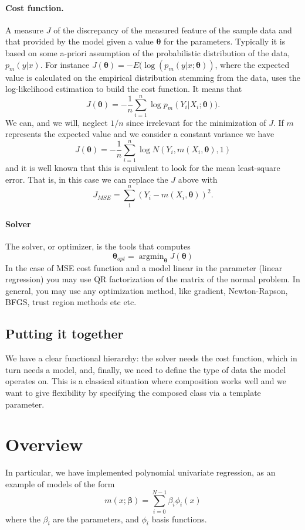 \documentclass{article}
\begin{document}
\paragraph{\textbf{Cost function.}} A measure $J$ of the discrepancy of
  the measured feature of the sample data and that provided by the model
  given a value $\boldsymbol{\theta}$ for the parameters. Typically it is based on some a-priori
  assumption of the probabilistic distribution of the data, $p_m(y|x)$. For instance $J(\boldsymbol{\theta})=-E(\log(p_m(y|x;\boldsymbol{\theta}))$,
  where the expected value is calculated on the empirical distribution stemming
  from the data,
  uses the log-likelihood estimation to build the cost function. It means that
  \[
   J(\boldsymbol{\theta})=-\frac{1}{n}\sum_{i=1}^n \log p_m(Y_i|X_i;\boldsymbol{\theta})).
 \]
 We can, and we will, neglect $1/n$ since irrelevant for the minimization of $J$.
 If $m$ represents the expected value and we consider a constant variance we have
   \[
   J(\boldsymbol{\theta})=-\frac{1}{n}\sum_{i=1}^n \log N(Y_i,m(X_i,\boldsymbol{\theta}),1)
 \]
 and it is well known that this is equivalent to look for the mean least-square
 error. That is, in this case we can replace the $J$ above with
 \[
   J_{MSE}=\sum_1^n(Y_i-  m(X_i,\boldsymbol{\theta}))^2.
 \]
 \paragraph{\textbf{Solver}} The solver, or optimizer, is the tools that computes
 \[
   \boldsymbol{\theta}_{opt}=\operatorname{argmin}_{\boldsymbol{\theta}}J(\boldsymbol{\theta})
 \]
 In the case of MSE cost function and a model linear in the parameter (linear regression) you may use QR factorization of the matrix of the normal problem.
 In general, you may use any optimization method, like gradient, Newton-Rapson, BFGS, trust region methods etc etc.

 \subsection{Putting it together}
 We have a clear functional hierarchy: the solver needs the cost function, which in turn needs a model, and, finally, we need to define the type of data
 the model operates on. This is a classical situation where composition
 works well and we want to give flexibility by specifying the composed class via
 a template parameter.
 
 
 \section{Overview}
In particular, we have implemented polynomial univariate regression, as an example of models of the form
\begin{equation}
m(x;\boldsymbol{\beta})=\sum_{i=0}^{N-1} \beta_i\phi_i(x)
\end{equation}
where the $\beta_i$ are the parameters, and $\phi_i$ basis functions.
\end{document}
